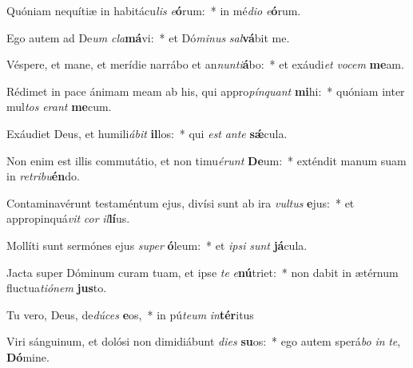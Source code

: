 \item Quóniam nequítiæ in habitácu\textit{lis} \textit{e}\textbf{ó}rum:~* in mé\textit{di}\textit{o} \textit{e}\textbf{ó}rum.
\item Ego autem ad De\textit{um} \textit{cla}\textbf{má}vi:~* et Dó\textit{mi}\textit{nus} \textit{sal}\textbf{vá}bit me.
\item Véspere, et mane, et merídie narrábo et an\textit{nun}\textit{ti}\textbf{á}bo:~* et exáudi\textit{et} \textit{vo}\textit{cem} \textbf{me}am.
\item Rédimet in pace ánimam meam ab his, qui appro\textit{pín}\textit{quant} \textbf{mi}hi:~* quóniam inter mul\textit{tos} \textit{e}\textit{rant} \textbf{me}cum.
\item Exáudiet Deus, et humili\textit{á}\textit{bit} \textbf{il}los:~* qui \textit{est} \textit{an}\textit{te} \textbf{sǽ}cula.
\item Non enim est illis commutátio, et non timu\textit{é}\textit{runt} \textbf{De}um:~* exténdit manum suam in \textit{re}\textit{tri}\textit{bu}\textbf{én}do.
\item Contaminavérunt testaméntum ejus, divísi sunt ab ira \textit{vul}\textit{tus} \textbf{e}jus:~* et appropinquá\textit{vit} \textit{cor} \textit{il}\textbf{lí}us.
\item Mollíti sunt sermónes ejus \textit{su}\textit{per} \textbf{ó}leum:~* et \textit{ip}\textit{si} \textit{sunt} \textbf{já}cula.
\item Jacta super Dóminum curam tuam, et ipse \textit{te} \textit{e}\textbf{nú}triet:~* non dabit in ætérnum fluctua\textit{ti}\textit{ó}\textit{nem} \textbf{jus}to.
\item Tu vero, Deus, de\textit{dú}\textit{ces} \textbf{e}os,~* in pú\textit{te}\textit{um} \textit{in}\textbf{tér}itus
\item Viri sánguinum, et dolósi non dimidiábunt \textit{di}\textit{es} \textbf{su}os:~* ego autem sperá\textit{bo} \textit{in} \textit{te}, \textbf{Dó}mine.
